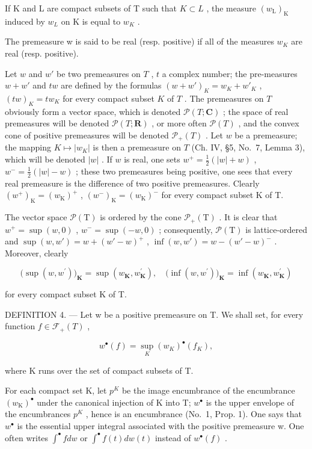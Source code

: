 If K and L are compact subsets of T such that \(K \subset L\) , the measure \((w_{\mathrm{L}})_{\mathrm{K}}\) induced by \(w_{L}\) on K is equal to \(w_{K}\) .

The premeasure w is said to be real (resp. positive) if all of the measures \(w_{K}\) are real (resp. positive).

Let \(w\) and \(w'\) be two premeasures on \(T\) , \(t\) a complex number; the pre-measures \(w + w'\) and \(tw\) are defined by the formulas \((w + w')_K = w_K + w'_K\) , \((tw)_K = tw_K\) for every compact subset \(K\) of \(T\) . The premeasures on \(T\) obviously form a vector space, which is denoted \(\mathcal{P}(T; \mathbf{C})\) ; the space of real premeasures will be denoted \(\mathcal{P}(T; \mathbf{R})\) , or more often \(\mathcal{P}(T)\) , and the convex cone of positive premeasures will be denoted \(\mathcal{P}_+(T)\) . Let \(w\) be a premeasure; the mapping \(K \mapsto |w_K|\) is then a premeasure on \(T\) (Ch. IV, §5, No.~7, Lemma 3), which will be denoted \(|w|\) . If \(w\) is real, one sets \(w^{+} = \frac{1}{2} (|w| + w)\) , \(w^{-} = \frac{1}{2} (|w| - w)\) ; these two premeasures being positive, one sees that every real premeasure is the difference of two positive premeasures. Clearly \((w^{+})_{\mathrm{K}} = (w_{\mathrm{K}})^{+}\) , \((w^{-})_{\mathrm{K}} = (w_{\mathrm{K}})^{-}\) for every compact subset K of T.

The vector space \(\mathcal{P}(\mathrm{T})\) is ordered by the cone \(\mathcal{P}_{+}(\mathrm{T})\) . It is clear that \(w^{+} = \sup(w,0)\) , \(w^{-} = \sup(-w,0)\) ; consequently, \(\mathcal{P}(\mathrm{T})\) is lattice-ordered and \(\sup(w,w') = w + (w' - w)^{+}\) , \(\inf(w,w') = w - (w' - w)^{-}\) . Moreover, clearly

\[
\big (\sup (w, w ^ {\prime}) \big) _ {\mathbf {K}} = \sup (w _ {\mathbf {K}}, w _ {\mathbf {K}} ^ {\prime}), \quad \big (\inf (w, w ^ {\prime}) \big) _ {\mathbf {K}} = \inf (w _ {\mathbf {K}}, w _ {\mathbf {K}} ^ {\prime})
\]

for every compact subset K of T.

DEFINITION 4. --- Let w be a positive premeasure on T. We shall set, for every function \(f \in \mathcal{F}_{+}(T)\) ,

\[
w ^ {\bullet} (f) = \sup _ {K} \left(w _ {K}\right) ^ {\bullet} \left(f _ {K}\right),\tag{1}
\]

where K runs over the set of compact subsets of T.

For each compact set K, let \(p^{K}\) be the image encumbrance of the encumbrance \((w_{\mathrm{K}})^{\bullet}\) under the canonical injection of K into T; \(w^{\bullet}\) is the upper envelope of the encumbrances \(p^{K}\) , hence is an encumbrance (No.~1, Prop. 1). One says that \(w^{\bullet}\) is the essential upper integral associated with the positive premeasure w. One often writes \(\int^{\bullet} f dw\) or \(\int^{\bullet} f(t) dw(t)\) instead of \(w^{\bullet}(f)\) .


